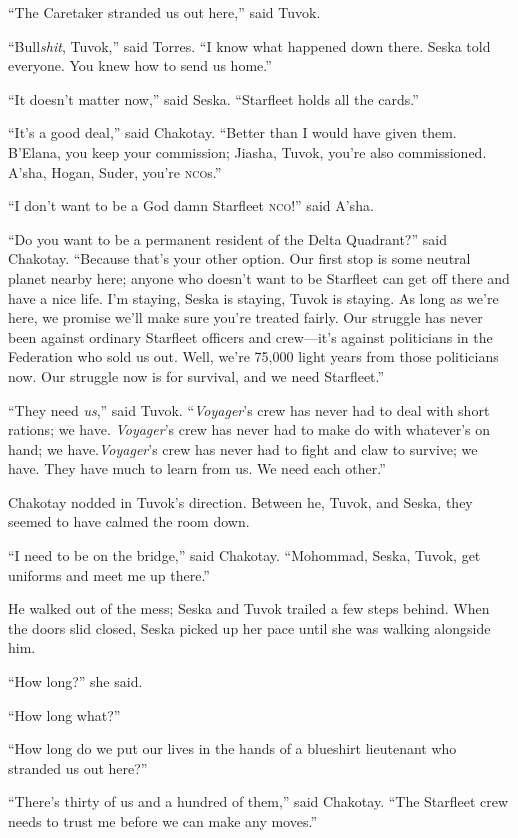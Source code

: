 \documentclass[twoside,letterpaper,12pt]{memoir}
\begin{document}
``The Caretaker stranded us out here,'' said Tuvok. 

``Bull\textit{shit}, Tuvok,'' said Torres. ``I know what happened down there. Seska told everyone. You knew how to send us home.'' 

``It doesn’t matter now,'' said Seska. ``Starfleet holds all the cards.'' 

``It’s a good deal,'' said Chakotay. ``Better than I would have given them. B’Elana, you keep your commission; Jiasha, Tuvok, you’re also commissioned. A’sha, Hogan, Suder, you’re \textsc{nco}s.'' 

``I don’t want to be a God damn Starfleet \textsc{nco}!'' said A’sha. 

``Do you want to be a permanent resident of the Delta Quadrant?'' said Chakotay. ``Because that’s your other option. Our first stop is some neutral planet nearby here; anyone who doesn’t want to be Starfleet can get off there and have a nice life. I’m staying, Seska is staying, Tuvok is staying. As long as we’re here, we promise we’ll make sure you’re treated fairly. Our struggle has never been against ordinary Starfleet officers and crew---it’s against politicians in the Federation who sold us out. Well, we’re 75,000 light years from those politicians now. Our struggle now is for survival, and we need Starfleet.'' 

``They need \textit{us},'' said Tuvok. ``\textit{Voyager}’s crew has never had to deal with short rations; we have. \textit{Voyager}’s crew has never had to make do with whatever’s on hand; we have.\textit{Voyager}’s crew has never had to fight and claw to survive; we have. They have much to learn from us. We need each other.'' 

Chakotay nodded in Tuvok’s direction. Between he, Tuvok, and Seska, they seemed to have calmed the room down. 

``I need to be on the bridge,'' said Chakotay. ``Mohommad, Seska, Tuvok, get uniforms and meet me up there.'' 

He walked out of the mess; Seska and Tuvok trailed a few steps behind. When the doors slid closed, Seska picked up her pace until she was walking alongside him. 

``How long?'' she said. 

``How long what?'' 

``How long do we put our lives in the hands of a blueshirt lieutenant who stranded us out here?'' 

``There’s thirty of us and a hundred of them,'' said Chakotay. ``The Starfleet crew needs to trust me before we can make any moves.'' 
\end{document}
